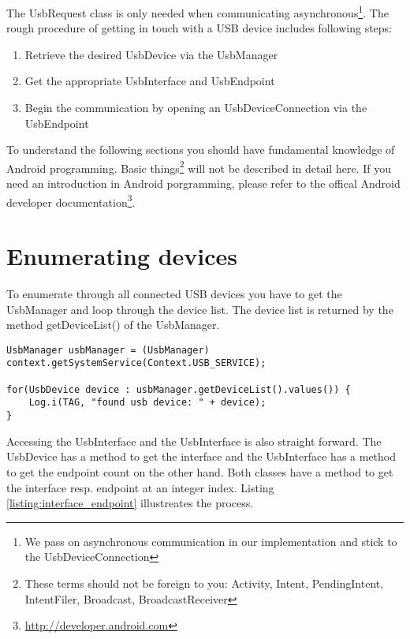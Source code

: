 The UsbRequest class is only needed when communicating asynchronous\footnote{We pass on asynchronous communication in our implementation and stick to the UsbDeviceConnection}. The rough procedure of getting in touch with a USB device includes following steps:

\begin{enumerate}
\item Retrieve the desired UsbDevice via the UsbManager
\item Get the appropriate UsbInterface and UsbEndpoint
\item Begin the communication by opening an UsbDeviceConnection via the UsbEndpoint
\end{enumerate}

To understand the following sections you should have fundamental knowledge of Android programming. Basic things\footnote{These terms should not be foreign to you: Activity, Intent, PendingIntent, IntentFiler, Broadcast, BroadcastReceiver} will not be described in detail here. If you need an introduction in Android porgramming, please refer to the offical Android developer documentation\footnote{\url{http://developer.android.com}}.

\section{Enumerating devices}

To enumerate through all connected USB devices you have to get the UsbManager and loop through the device list. The device list is returned by the method getDeviceList() of the UsbManager.

\begin{lstlisting}[caption=Enumerating connected USB devices, label=listing:enumerate]
UsbManager usbManager = (UsbManager) context.getSystemService(Context.USB_SERVICE);
		
for(UsbDevice device : usbManager.getDeviceList().values()) {
	Log.i(TAG, "found usb device: " + device);
}
\end{lstlisting}

Accessing the UsbInterface and the UsbInterface is also straight forward. The UsbDevice has a method to get the interface and the UsbInterface has a method to get the endpoint count on the other hand. Both classes have a method to get the interface resp. endpoint at an integer index. Listing \ref{listing:interface_endpoint} illustreates the process.

